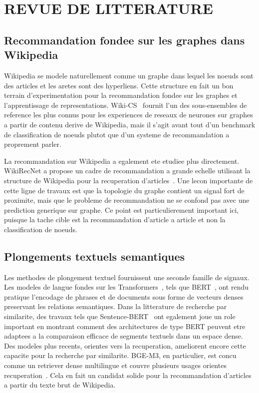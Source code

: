\chapter{REVUE DE LITTERATURE}
\thispagestyle{empty}

\section{Recommandation fondee sur les graphes dans Wikipedia}

Wikipedia se modele naturellement comme un graphe dans lequel les noeuds sont
des articles et les aretes sont des hyperliens. Cette structure en fait un bon
terrain d'experimentation pour la recommandation fondee sur les graphes et
l'apprentissage de representations. Wiki-CS~\cite{mernyei2020wikics} fournit
l'un des sous-ensembles de reference les plus connus pour les experiences de
reseaux de neurones sur graphes a partir de contenu derive de Wikipedia, mais
il s'agit avant tout d'un benchmark de classification de noeuds plutot que
d'un systeme de recommandation a proprement parler.

La recommandation sur Wikipedia a egalement ete etudiee plus directement.
WikiRecNet a propose un cadre de recommandation a grande echelle utilisant la
structure de Wikipedia pour la recuperation d'articles~\cite{wikirecnet2020}.
Une lecon importante de cette ligne de travaux est que la topologie du graphe
contient un signal fort de proximite, mais que le probleme de recommandation ne
se confond pas avec une prediction generique sur graphe. Ce point est
particulierement important ici, puisque la tache cible est la recommandation
d'article a article et non la classification de noeuds.

\section{Plongements textuels semantiques}

Les methodes de plongement textuel fournissent une seconde famille de signaux.
Les modeles de langue fondes sur les Transformers~\cite{vaswani2017attention},
tels que BERT~\cite{devlin2019bert}, ont rendu pratique l'encodage de phrases et de
documents sous forme de vecteurs denses preservant les relations semantiques.
Dans la litterature de recherche par similarite, des travaux tels que
Sentence-BERT~\cite{reimers2019sentencebert} ont egalement joue un role
important en montrant comment des architectures de type BERT peuvent etre
adaptees a la comparaison efficace de segments textuels dans un espace dense.
Des modeles plus recents, orientes vers la recuperation, ameliorent encore
cette capacite pour la recherche par similarite. BGE-M3, en particulier, est
concu comme un retriever dense multilingue et couvre plusieurs usages
orientes recuperation~\cite{chen2025bgem3}. Cela en fait un candidat solide
pour la recommandation d'articles a partir du texte brut de Wikipedia.

